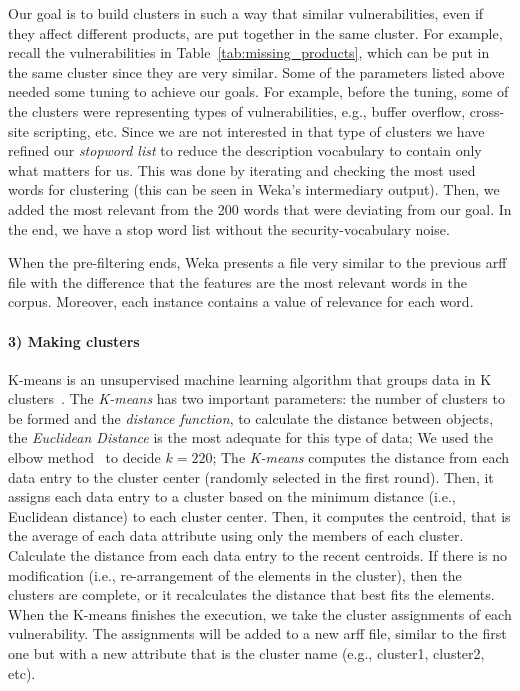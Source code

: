 Our goal is to build clusters in such a way that similar vulnerabilities, even if they affect different products, are put together in the same cluster. 
For example, recall the vulnerabilities in Table~\ref{tab:missing_products}, which can be put in the same cluster since they are very similar.
Some of the parameters listed above needed some tuning to achieve our goals.
For example, before the tuning, some of the clusters were representing types of vulnerabilities, e.g., buffer overflow, cross-site scripting, etc. 
Since we are not interested in that type of clusters we have refined our \emph{stopword list} to reduce the description vocabulary to contain only what matters for us.
This was done by iterating and checking the most used words for clustering (this can be seen in Weka's intermediary output).
Then, we added the most relevant from the 200 words that were deviating from our goal.
In the end, we have a stop word list without the security-vocabulary noise.


When the pre-filtering ends, Weka presents a file very similar to the previous \gls{arff} file with the difference that the features are the most relevant words in the corpus. 
Moreover, each instance contains a value of relevance for each word.


\paragraph{3) Making clusters}
K-means is an unsupervised machine learning algorithm that groups data in K clusters~\cite{Jain:2010}.
The \emph{K-means} has two important parameters: the number of clusters to be formed and the \emph{distance function}, to calculate the distance between objects, the \emph{Euclidean Distance} is the most adequate for this type of data; We used the elbow method~\cite{Thorndike:1953} to decide $k=220$;
The \emph{K-means} computes the distance from each data entry to the cluster center (randomly selected in the first round).
Then, it assigns each data entry to a cluster based on the minimum distance (i.e., Euclidean distance) to each cluster center.
Then, it computes the centroid, that is the average of each data attribute using only the members of each cluster.
Calculate the distance from each data entry to the recent centroids. 
If there is no modification (i.e., re-arrangement of the elements in the cluster), then the clusters are complete, or it recalculates the distance that best fits the elements. 
When the K-means finishes the execution, we take the cluster assignments of each vulnerability. 
The assignments will be added to a new \gls{arff} file, similar to the first one but with a new attribute that is the cluster name (e.g., cluster1, cluster2, etc). 



